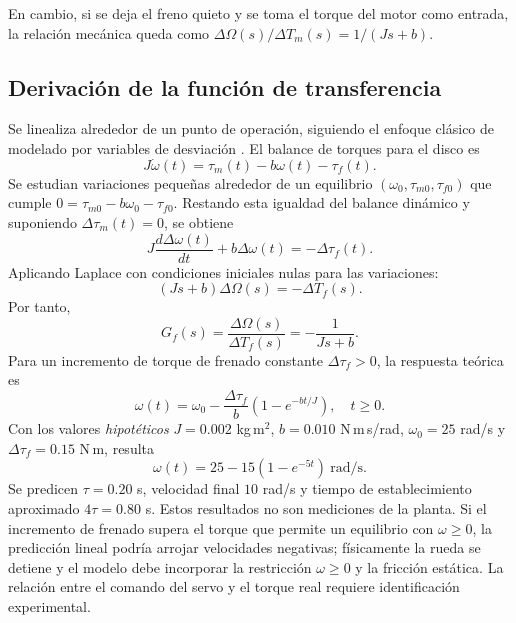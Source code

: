 \documentclass[9pt,a4paper,twocolumn]{extarticle}
\begin{document}
En cambio, si se deja el freno quieto y se toma el torque del motor como entrada, la relación mecánica queda como $\Delta\Omega(s)/\Delta T_m(s)=1/(Js+b)$. 

\subsection{Derivación de la función de transferencia}
Se linealiza alrededor de un punto de operación, siguiendo el enfoque clásico de modelado por variables de desviación \cite{franklin2015}.
El balance de torques para el disco es
\begin{equation}
J\dot\omega(t)=\tau_m(t)-b\omega(t)-\tau_f(t).
\end{equation}
Se estudian variaciones pequeñas alrededor de un equilibrio
$(\omega_0,\tau_{m0},\tau_{f0})$ que cumple
$0=\tau_{m0}-b\omega_0-\tau_{f0}$. Restando esta igualdad del
balance dinámico y suponiendo $\Delta\tau_m(t)=0$, se obtiene
\begin{equation}
J\frac{d\Delta\omega(t)}{dt}+b\Delta\omega(t)
=-\Delta\tau_f(t).
\end{equation}
Aplicando Laplace con condiciones iniciales nulas para las variaciones:
\begin{equation}
(Js+b)\Delta\Omega(s)=-\Delta T_f(s).
\end{equation}
Por tanto,
\begin{equation}
\boxed{G_f(s)=\frac{\Delta\Omega(s)}{\Delta T_f(s)}
=-\frac{1}{Js+b}.}
\end{equation}
Para un incremento de torque de frenado constante $\Delta\tau_f>0$,
la respuesta teórica es
\begin{equation}
\omega(t)=\omega_0-\frac{\Delta\tau_f}{b}
\left(1-e^{-bt/J}\right),\quad t\geq0.
\end{equation}
Con los valores \emph{hipotéticos} $J=0.002$ kg\,m$^2$,
$b=0.010$ N\,m\,s/rad, $\omega_0=25$ rad/s y
$\Delta\tau_f=0.15$ N\,m, resulta
\begin{equation}
\boxed{\omega(t)=25-15(1-e^{-5t})\ \mathrm{rad/s}.}
\end{equation}
Se predicen $\tau=0.20$ s, velocidad final $10$ rad/s y tiempo de
establecimiento aproximado $4\tau=0.80$ s. Estos resultados no son
mediciones de la planta. Si el incremento de frenado supera el torque
que permite un equilibrio con $\omega\geq0$, la predicción lineal
podría arrojar velocidades negativas; físicamente la rueda se detiene
y el modelo debe incorporar la restricción $\omega\geq0$ y la fricción
estática. La relación entre el comando del servo y el torque real
requiere identificación experimental.
\end{document}
